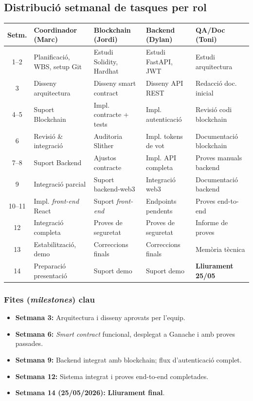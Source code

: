 \documentclass[12pt,a4paper,catalan]{article}
\begin{document}
\subsection{Distribució setmanal de tasques per rol}

\begin{center}
\begin{tabular}{cllll}
\toprule
\textbf{Setm.} & \textbf{Coordinador (Marc)} & \textbf{Blockchain (Jordi)} & \textbf{Backend (Dylan)} & \textbf{QA/Doc (Toni)} \\
\midrule
1--2   & Planificació, WBS, setup Git & Estudi Solidity, Hardhat & Estudi FastAPI, JWT & Estudi arquitectura \\
3      & Disseny arquitectura & Disseny smart contract & Disseny API REST & Redacció doc. inicial \\
4--5   & Suport Blockchain & Impl. contracte + tests & Impl. autenticació & Revisió codi blockchain \\
6      & Revisió \& integració & Auditoria Slither & Impl. tokens de vot & Documentació blockchain \\
7--8   & Suport Backend & Ajustos contracte & Impl. API completa & Proves manuals backend \\
9      & Integració parcial & Suport backend-web3 & Integració web3 & Documentació backend \\
10--11 & Impl. \textit{front-end} React & Suport \textit{front-end} & Endpoints pendents & Proves end-to-end \\
12     & Integració completa & Proves de seguretat & Proves de seguretat & Informe de proves \\
13     & Estabilització, demo & Correccions finals & Correccions finals & Memòria tècnica \\
14     & Preparació presentació & Suport demo & Suport demo & \textbf{Lliurament 25/05} \\
\bottomrule
\end{tabular}
\end{center}

\subsubsection{Fites (\textit{milestones}) clau}

\begin{itemize}
    \item \textbf{Setmana 3:} Arquitectura i disseny aprovats per l'equip.
    \item \textbf{Setmana 6:} \textit{Smart contract} funcional, desplegat a Ganache i amb proves passades.
    \item \textbf{Setmana 9:} Backend integrat amb blockchain; flux d'autenticació complet.
    \item \textbf{Setmana 12:} Sistema integrat i proves end-to-end completades.
    \item \textbf{Setmana 14 (25/05/2026):} \textbf{Lliurament final}.
\end{itemize}
\end{document}
